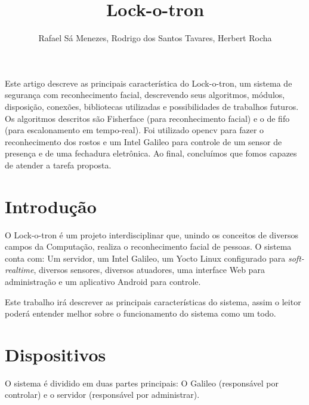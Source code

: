 \documentclass[12pt]{article}
\title{Lock-o-tron}
\author{Rafael Sá Menezes\inst{1}, Rodrigo dos Santos Tavares\inst{1}, Herbert Rocha\inst{1} }
\begin{document}
\maketitle

\begin{abstract}

\end{abstract}

\begin{resumo}
    Este artigo descreve as principais característica do Lock-o-tron, um
    sistema de segurança com reconhecimento facial, descrevendo seus algoritmos,
    módulos, disposição, conexões, bibliotecas utilizadas e possibilidades de
    trabalhos futuros. Os algoritmos descritos são Fisherface (para
    reconhecimento facial) e o de fifo (para escalonamento em tempo-real).
    Foi utilizado opencv para fazer o reconhecimento dos rostos e um Intel
    Galileo para controle de um sensor de presença e de uma fechadura eletrônica.
    Ao final, concluímos que fomos capazes de atender a tarefa proposta.


\end{resumo}


\section{Introdução}
    O Lock-o-tron é um projeto interdisciplinar que, unindo os conceitos de
    diversos campos da Computação, realiza o reconhecimento facial de pessoas. O
    sistema conta com: Um servidor, um Intel Galileo, um Yocto Linux configurado
    para \textit{soft-realtime}, diversos sensores, diversos atuadores, uma
    interface Web para administração e um aplicativo Android para controle.

    Este trabalho irá descrever as principais características do sistema, assim
    o leitor poderá entender melhor sobre o funcionamento do sistema como um
    todo.


\section{Dispositivos}
    O sistema é dividido em duas partes principais: O Galileo (responsável por
    controlar) e o servidor (responsável por administrar).
\end{document}
